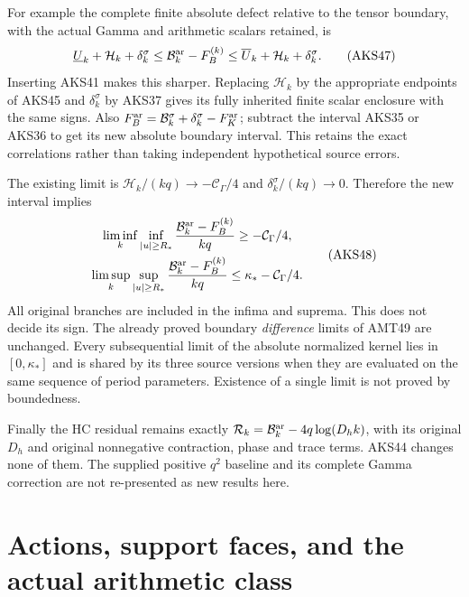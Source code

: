 \documentclass[11pt,a4paper]{article}
\begin{document}
For example the complete finite absolute defect relative to the tensor
boundary, with the actual Gamma and arithmetic scalars retained, is
\[
 \underline U_k+\mathcal H_k+\delta_k^\sigma
 \le\mathcal B_k^{\rm ar}-F_B^{(k)}
 \le\overline U_k+\mathcal H_k+\delta_k^\sigma.
 \tag{AKS47}
\]
Inserting AKS41 makes this sharper. Replacing $\mathcal H_k$ by the
appropriate endpoints of AKS45 and $\delta_k^\sigma$ by AKS37 gives its
fully inherited finite scalar enclosure with the same signs.
Also $F_B^{\rm ar}=\mathcal B_k^\sigma+\delta_k^\sigma-F_K^{\rm ar}$;
subtract the interval AKS35 or AKS36 to get its new absolute boundary
interval. This retains the exact correlations rather than taking
independent hypothetical source errors.

The existing limit is
$\mathcal H_k/(kq)\to-\mathcal C_\Gamma/4$ and
$\delta_k^\sigma/(kq)\to0$. Therefore the new interval implies
\[
\begin{gathered}
 \liminf_k\inf_{|u|\ge R_*}
 \frac{\mathcal B_k^{\rm ar}-F_B^{(k)}}{kq}
          \ge-\mathcal C_\Gamma/4,\\
 \limsup_k\sup_{|u|\ge R_*}
 \frac{\mathcal B_k^{\rm ar}-F_B^{(k)}}{kq}
          \le\kappa_*-\mathcal C_\Gamma/4.
\end{gathered}\tag{AKS48}
\]
All original branches are included in the infima and suprema. This does
not decide its sign. The already proved boundary \emph{difference}
limits of AMT49 are unchanged. Every subsequential limit of the absolute
normalized kernel lies in $[0,\kappa_*]$ and is shared by its three source
versions when they are evaluated on the same sequence of period
parameters. Existence of a single limit is not proved by boundedness.

Finally the HC residual remains exactly
$\mathcal R_k=\mathcal B_k^{\rm ar}-4q\log(D_hk)$, with its original
$D_h$ and original nonnegative contraction, phase and trace terms.
AKS44 changes none of them. The supplied positive $q^2$ baseline and
its complete Gamma correction are not re-presented as new results here.

\section{Actions, support faces, and the actual arithmetic class}
\label{sec:AKS-actions}
\end{document}
